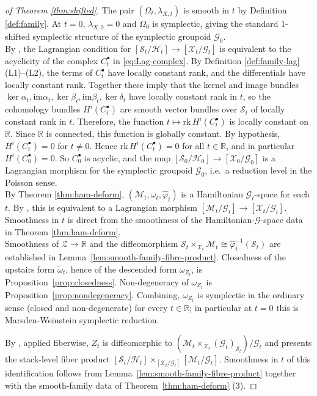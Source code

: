\documentclass[reqno]{amsart}
\theoremstyle{plain}
\theoremstyle{definition}
\newcommand{\R}{\mathbb{R}}
\newcommand{\G}{\mathcal{G}}
\renewcommand{\H}{\mathcal{H}}
\renewcommand{\S}{\mathcal{S}}
\newcommand{\M}{\mathcal{M}}
\newcommand{\X}{\mathcal{X}}
\begin{document}
\begin{proof}[of Theorem \ref{thm:shifted}]
The pair $(\Omega_t, \lambda_{X,t})$ is smooth in $t$ by Definition \ref{def:family}. At $t = 0$, $\lambda_{X,0} = 0$ and $\Omega_0$ is symplectic, giving the standard $1$-shifted symplectic structure of the symplectic groupoid $\G_0$.\\

By \cite[Theorem 5.6]{bualibanu2026reduction}, the Lagrangian condition for $[\S_t / \H_t] \to [\X_t / \G_t]$ is equivalent to the acyclicity of the complex $C^\bullet_t$ in \eqref{eq:Lag-complex}. By Definition \ref{def:family-lag}(L1)--(L2), the terms of $C^\bullet_t$ have locally constant rank, and the differentials have locally constant rank. Together these imply that the kernel and image bundles $\ker \alpha_t, \text{im} \alpha_t, \ker \beta_t, \text{im} \beta_t, \ker \delta_t$ have locally constant rank in $t$, so the cohomology bundles $H^i(C^\bullet_t)$ are smooth vector bundles over $\S_t$ of locally constant rank in $t$. Therefore, the function $t \mapsto \mathrm{rk}\, H^i(C^\bullet_t)$ is locally constant on $\R$. Since $\R$ is connected, this function is globally constant. By hypothesis, $H^i(C^\bullet_t) = 0$ for $t \neq 0$. Hence $\mathrm{rk}\, H^i(C^\bullet_t) = 0$ for all $t \in \R$, and in particular $H^i(C^\bullet_0) = 0$. So $C^\bullet_0$ is acyclic, and the map $[\S_0 / \H_0] \to [\X_0 / \G_0]$ is a Lagrangian morphism for the symplectic groupoid $\G_0$, i.e.\ a reduction level in the Poisson sense.\\

 
By Theorem \ref{thm:ham-deform}, $(\M_t, \omega_t, \hat\varphi_t)$ is a Hamiltonian $\G_t$-space for each $t$. By \cite[Proposition 5.5]{bualibanu2026reduction}, this is equivalent to a Lagrangian morphism $[\M_t / \G_t] \to [\X_t / \G_t]$. Smoothness in $t$ is direct from the smoothness of the Hamiltonian-$\G$-space data in Theorem \ref{thm:ham-deform}.\\

 
Smoothness of $\mathcal{Z} \to \mathbb{R}$ and the
diffeomorphism $\S_t \times_{\X_t} \M_t \cong \hat\varphi_t^{-1}(\S_t)$ are
established in Lemma~\ref{lem:smooth-family-fibre-product}.
Closedness of the upstairs form $\widetilde\omega_t$, hence of the
descended form $\omega_{Z_t}$, is
Proposition~\ref{prop:closedness}. Non-degeneracy of $\omega_{Z_t}$ is
Proposition~\ref{prop:nondegeneracy}. Combining, $\omega_{Z_t}$ is
symplectic in the ordinary sense (closed and non-degenerate) for every
$t \in \mathbb{R}$; in particular at $t = 0$ this is
Marsden-Weinstein symplectic reduction.
 
By \cite[Proposition 3.7 and Remark 5.12]{bualibanu2026reduction}, applied fiberwise, $Z_t$ is diffeomorphic to
$(\M_t \times_{\X_t} (\G_t)_{\S_t})/\G_t$ and presents
the stack-level fiber product
$[\S_t/\H_t] \times_{[\X_t/\G_t]} [\M_t/\G_t]$.
Smoothness in $t$ of this identification follows from
Lemma~\ref{lem:smooth-family-fibre-product} together with the
smooth-family data of Theorem~\ref{thm:ham-deform} (3).

\end{proof}
\end{document}
